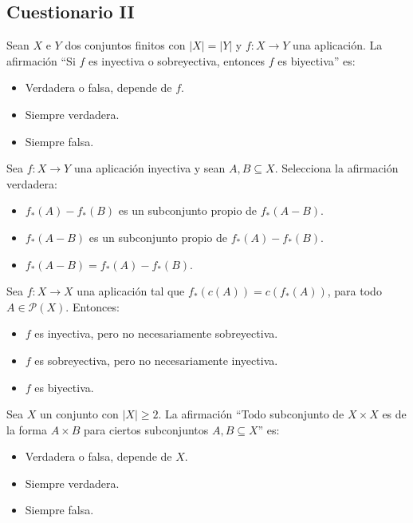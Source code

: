 \subsection{Cuestionario II}
\begin{ejercicio}
    Sean $X$ e $Y$ dos conjuntos finitos con $|X| = |Y|$ y $f:X \rightarrow Y$ una aplicación. La afirmación ``Si $f$ es inyectiva o sobreyectiva, entonces $f$ es biyectiva'' es:
    \begin{itemize}
        \item Verdadera o falsa, depende de $f$.
        \item Siempre verdadera.
        \item Siempre falsa.
    \end{itemize}
\end{ejercicio}

\begin{ejercicio}
    Sea $f:X \rightarrow Y$ una aplicación inyectiva y sean $A, B \subseteq X$. Selecciona la afirmación verdadera:
    \begin{itemize}
        \item $f_{*}(A) - f_{*}(B)$ es un subconjunto propio de $f_{*}(A-B)$.
        \item $f_{*}(A-B)$ es un subconjunto propio de $f_{*}(A) - f_{*}(B)$.
        \item $f_{*}(A-B) = f_{*}(A) - f_{*}(B)$.
    \end{itemize}
\end{ejercicio}

\begin{ejercicio}
    Sea $f:X \rightarrow X$ una aplicación tal que $f_{*}(c(A)) = c(f_{*}(A))$, para todo $A \in \mathcal{P}(X)$. Entonces:
    \begin{itemize}
        \item $f$ es inyectiva, pero no necesariamente sobreyectiva.
        \item $f$ es sobreyectiva, pero no necesariamente inyectiva.
        \item $f$ es biyectiva.
    \end{itemize}
\end{ejercicio}

\begin{ejercicio}
Sea $X$ un conjunto con $|X|\geq 2$. La afirmación ``Todo subconjunto de $X \times X$ es de la forma $A \times B$ para ciertos subconjuntos $A, B \subseteq X$'' es:
    \begin{itemize}
        \item Verdadera o falsa, depende de $X$.
        \item Siempre verdadera.
        \item Siempre falsa.
    \end{itemize}
\end{ejercicio}


